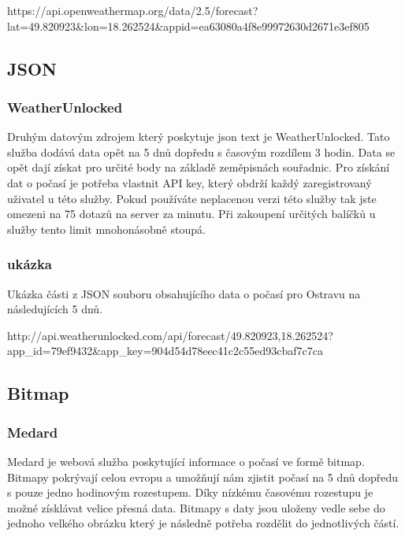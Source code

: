 \documentclass[czech,bachelor,dept460,male,csharp,cpdeclaration]{diploma}
\begin{document}
	https://api.openweathermap.org/data/2.5/forecast?lat=49.820923\&lon=18.262524\&appid=ea63080a4f8e99972630d2671e3ef805
	
	
	
	\subsection{JSON}
	\subsubsection{WeatherUnlocked}
	
	Druhým datovým zdrojem který poskytuje json text je WeatherUnlocked. Tato služba dodává data opět na 5 dnů dopředu s časovým rozdílem 3 hodin. Data se opět dají získat pro určité body na základě zeměpisnách souřadnic. Pro získání dat o počasí je potřeba vlastnit API key, který obdrží každý zaregistrovaný uživatel u této služby. Pokud používáte neplacenou verzi této služby tak jste omezeni na 75 dotazů na server za minutu. Při zakoupení určitých balíčků u služby tento limit mnohonásobně stoupá.
	
	\subsubsection{ukázka}
	
	Ukázka části z JSON souboru obsahujícího data o počasí pro Ostravu na následujících 5 dnů.
	
	http://api.weatherunlocked.com/api/forecast/49.820923,18.262524?app\_id=79ef9432\&app\_key=904d54d78eec41c2c55ed93cbaf7c7ca
	
	
	
	\subsection{Bitmap}
	\subsubsection{Medard}
	
	Medard je webová služba poskytující informace o počasí ve formě bitmap. Bitmapy pokrývají celou evropu a umožňují nám zjistit počasí na 5 dnů dopředu s pouze jedno hodinovým rozestupem. Díky nízkému časovému rozestupu je možné získlávat velice přesná data. Bitmapy s daty jsou uloženy vedle sebe do jednoho velkého obrázku který je následně potřeba rozdělit do jednotlivých částí.
	
\end{document}
